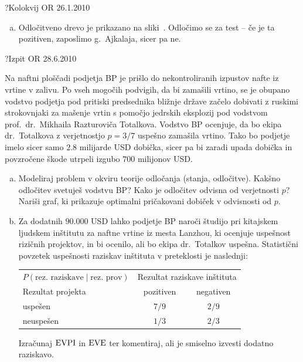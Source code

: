 \begin{naloga}{?}{Kolokvij OR 26.1.2010}
\begin{odgovor}
\begin{enumerate}[(a)]
\item Odločitveno drevo je prikazano na sliki~.
Odločimo se za test -- če je ta pozitiven, zaposlimo g.~Ajkalaja, sicer pa ne.
\end{enumerate}

\begin{slika}
\end{slika}

\begin{slika}
\end{slika}
\end{odgovor}
\end{naloga}


\begin{naloga}{?}{Izpit OR 28.6.2010}
\begin{vprasanje}[bp]
Na naftni ploščadi podjetja BP
je prišlo do nekontroliranih izpustov nafte iz vrtine v zalivu.
Po vseh mogočih podvigih, da bi zamašili vrtino,
se je ob\-upa\-no vodstvo podjetja pod pritiski predsednika bližnje države
začelo dobivati z ruskimi strokovnjaki
za mašenje vrtin s pomočjo jedrskih eksplozij pod vodstvom
prof.~dr.~Mikhaila Razturoviča Totalkova.
Vodstvo BP ocenjuje, da bo ekipa dr.~Totalkova
z verjetnostjo $p = 3/7$ uspešno zamašila vrtino.
Tako bo podjetje imelo sicer samo $2.8$ milijarde USD dobička,
sicer pa bi zaradi upada dobička in povzročene škode
utrpeli izgubo $700$ milijonov USD.

\begin{enumerate}[(a)]
\item Modeliraj problem v okviru teorije odločanja (stanja, odločitve).
Kakšno odločitev svetuješ vodstvu BP?
Kako je odločitev odvisna od verjetnosti $p$?
Nariši graf, ki prikazuje optimalni pričakovani dobiček v odvisnosti od $p$.

\item Za dodatnih $90.000$ USD lahko podjetje BP naroči študijo
pri kitajskem ljudskem inštitutu za naftne vrtine iz mesta Lanzhou,
ki ocenjuje uspešnost rizičnih projektov,
in bi ocenilo, ali bo ekipa dr.~Totalkov uspešna.
Statistični povzetek uspešnosti raziskav inštituta v preteklosti je naslednji:
\begin{center}
\begin{tabular}{l|cc}
$P(\text{rez.~raziskave} \;|\; \text{rez.~prov})$ &
\multicolumn{2}{c}{Rezultat raziskave inštituta} \\
Rezultat projekta & pozitiven & negativen \\ \hline
uspešen   &  $7/9$ & $2/9$ \\
neuspešen &  $1/3$ & $2/3$
\end{tabular}
\end{center}
Izračunaj $\operatorname{EVPI}$ in $\operatorname{EVE}$ ter komentiraj,
ali je smiselno izvesti dodatno raziskavo.


\end{enumerate}
\end{vprasanje}
\end{naloga}
